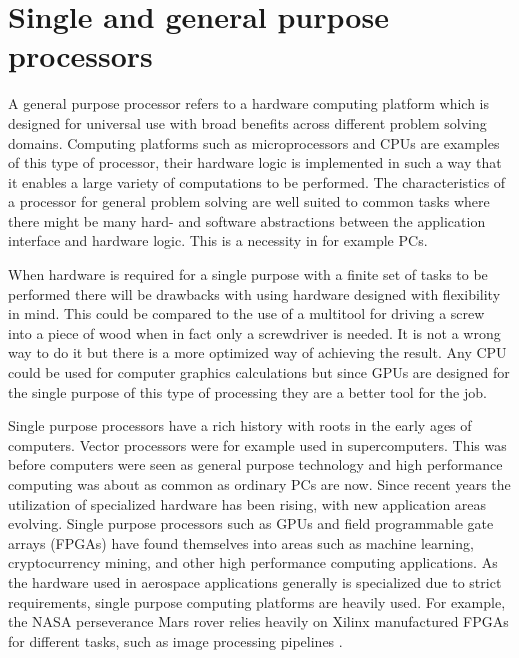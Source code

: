 \documentclass[12pt]{report}
\begin{document}
\section{Single and general purpose processors}
A general purpose processor refers to a hardware computing platform which is designed for universal use with broad benefits across different problem solving domains. Computing platforms such as microprocessors and CPUs are examples of this type of processor, their hardware logic is implemented in such a way that it enables a large variety of computations to be performed. 
The characteristics of a processor for general problem solving are well suited to common tasks where there might be many hard- and software abstractions between the application interface and hardware logic. This is a necessity in for example PCs.
\par
When hardware is required for a single purpose with a finite set of tasks to be performed there will be drawbacks with using hardware designed with flexibility in mind. This could be compared to the use of a multitool for driving a screw into a piece of wood when in fact only a screwdriver is needed. It is not a wrong way to do it but there is a more optimized way of achieving the result. Any CPU could be used for computer graphics calculations but since GPUs are designed for the single purpose of this type of processing they are a better tool for the job.
\par
Single purpose processors have a rich history with roots in the early ages of computers. Vector processors were for example used in supercomputers.
This was before computers were seen as general purpose technology and high performance computing was about as common as ordinary PCs are now.
Since recent years the utilization of specialized hardware has been rising, with new application areas evolving. Single purpose processors such as GPUs and field programmable gate arrays (FPGAs) have found themselves into areas such as machine learning, cryptocurrency mining, and other high performance computing applications.
As the hardware used in aerospace applications generally is specialized due to strict requirements, single purpose computing platforms are heavily used. For example, the NASA perseverance Mars rover relies heavily on Xilinx manufactured FPGAs for different tasks, such as image processing pipelines \citep{XilPerservance}.
\end{document}
